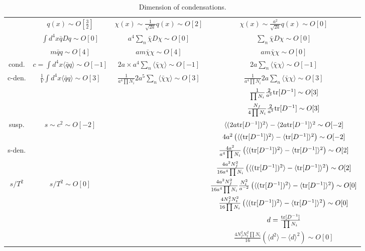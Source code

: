 \begin{table}
\begin{center}
\begin{tabular}{cccc}
\hline
 & $q(x)\sim O[\frac{3}{2}]$ & $\chi(x) \sim \frac{1}{\sqrt{2a}}q(x) \sim O[2]$ & $\chi(x) \sim \frac{a^2}{\sqrt{2a}}q(x) \sim O[0]$ \\
 & $\int d^4 x \bar{q}Dq \sim O[0]$ & $a^4\sum _n \bar{\chi}D\chi \sim O[0]$ & $\sum _n \bar{\chi}D\chi \sim O[0]$ \\
 & $m\bar{q}q \sim O[4]$ & $am \bar{\chi}\chi \sim O[4]$ & $am \bar{\chi}\chi \sim O[0]$ \\
cond. & $c=\int d^4 x\langle\bar{q}q \rangle \sim O[-1]$ & $2a \times a^4\sum _n \langle \bar{\chi}\chi \rangle \sim O[-1]$ & $2a \sum _n \langle \bar{\chi}\chi \rangle \sim O[-1]$ \\ 
c-den. & $\frac{1}{V}\int d^4 x\langle\bar{q}q \rangle \sim O[3]$ & $\frac{1}{a^4\prod N_i} 2a^5\sum _n \langle \bar{\chi}\chi \rangle \sim O[3]$ & $\frac{1}{a^4\prod N_i} 2a \sum _n \langle \bar{\chi}\chi \rangle \sim O[3]$ \\ 
 &  &  & $\frac{1}{\prod N_i} \frac{2}{a^3} {\rm tr}[D^{-1}] \sim O[3]$ \\ 
 &  &  & $\frac{N_f}{4\prod N_i} \frac{2}{a^3} {\rm tr}[D^{-1}] \sim O[3]$ \\ 
 susp. & $s \sim c^2 \sim O[-2]$ & & $\langle (2a {\rm tr}[D^{-1}])^2\rangle - \langle 2a {\rm tr}[D^{-1}]\rangle ^2 \sim O[-2]$ \\
 & & & $4a^2\left(\langle ({\rm tr}[D^{-1}])^2\rangle - \langle {\rm tr}[D^{-1}]\rangle ^2\right) \sim O[-2]$ \\
 s-den. & & & $\frac{4a^2}{a^4 \prod N_i}\left(\langle ({\rm tr}[D^{-1}])^2\rangle - \langle {\rm tr}[D^{-1}]\rangle ^2\right) \sim O[2]$ \\
             & & & $\frac{4a^2 N_f^2}{16a^4 \prod N_i}\left(\langle ({\rm tr}[D^{-1}])^2\rangle - \langle {\rm tr}[D^{-1}]\rangle ^2\right) \sim O[2]$ \\
 $s/T^2$ & $s/T^2\sim O[0]$ & & $\frac{4a^2 N_f^2}{16a^4 \prod N_i}\frac{N_t^2}{a^{-2}}\left(\langle ({\rm tr}[D^{-1}])^2\rangle - \langle {\rm tr}[D^{-1}]\rangle ^2\right) \sim O[0]$\\
 & & & $\frac{4N_f^2N_t^2}{16\prod N_i}\left(\langle ({\rm tr}[D^{-1}])^2\rangle - \langle {\rm tr}[D^{-1}]\rangle ^2\right) \sim O[0]$\\
 & & & $d=\frac{{\rm tr}[D^{-1}]}{\prod N_i}$\\
 & & & $\frac{4N_f^2N_t^2 \prod N_i}{16}\left(\langle d^2\rangle - \langle d \rangle ^2\right) \sim O[0]$\\
\hline 
\end{tabular}
\end{center}
\caption{\label{tab:DimensionOfCondensation}Dimension of condensations.}
\end{table} 

